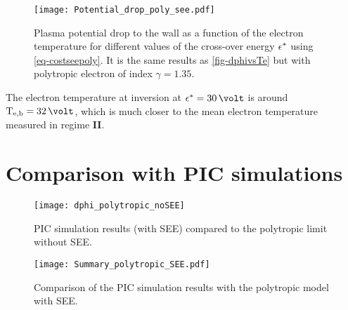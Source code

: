 \begin{figure}[hbtp]
  \centering
  \texttt{[image: Potential\_drop\_poly\_see.pdf]}
  \caption{ Plasma potential drop to the wall as a function of the electron temperature for different values of the cross-over energy $\epsilon^{*}$ using \cref{eq-costseepoly}. It is the same results as  \cref{fig-dphivsTe} but with polytropic electron of index $\gamma=1.35$.}
  \label{fig-rso_crit_see}
\end{figure}

The electron temperature at inversion at $\crover=30\,\volt$ is around $\Teb=32\,\volt$, which is much closer to the mean electron temperature measured in regime {\bf II}.





\FloatBarrier

\section{Comparison with PIC simulations} \label{subsec-picandmodel}

\begin{figure}[hbtp]
  \centering
  \texttt{[image: dphi\_polytropic\_noSEE]}
  \caption{PIC simulation results (with SEE) compared to the polytropic limit without SEE.}
  \label{fig-polytropic_pic_noSEE}
\end{figure}

\begin{figure}[hbtp]
  \centering
  \texttt{[image: Summary\_polytropic\_SEE.pdf]}
  \caption{Comparison of the PIC simulation results with the polytropic model with SEE.}
  \label{fig-polytropic_see_summary}
\end{figure}
